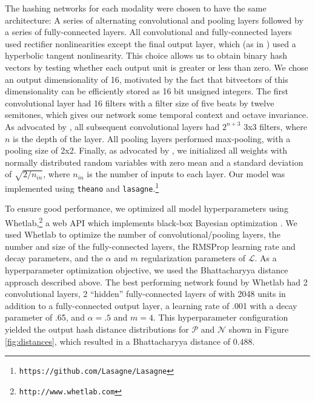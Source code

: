 \documentclass{article}
\begin{document}
The hashing networks for each modality were chosen to have the same architecture: A series of alternating convolutional and pooling layers followed by a series of fully-connected layers.
All convolutional and fully-connected layers used rectifier nonlinearities except the final output layer, which (as in \cite{masci2014multimodal}) used a hyperbolic tangent nonlinearity.
This choice allows us to obtain binary hash vectors by testing whether each output unit is greater or less than zero.
We chose an output dimensionality of 16, motivated by the fact that bitvectors of this dimensionality can be efficiently stored as 16 bit unsigned integers.
The first convolutional layer had 16 filters with a filter size of five beats by twelve semitones, which gives our network some temporal context and octave invariance.
As advocated by \cite{simonyan2014very}, all subsequent convolutional layers had $2^{n + 3}$ 3x3 filters, where $n$ is the depth of the layer.
All pooling layers performed max-pooling, with a pooling size of 2x2.
Finally, as advocated by \cite{he2015delving}, we initialized all weights with normally distributed random variables with zero mean and a standard deviation of $\sqrt{2/n_{in}}$, where $n_{in}$ is the number of inputs to each layer.
Our model was implemented using \texttt{theano} \cite{bastien2012theano} and \texttt{lasagne}.\footnote{\texttt{https://github.com/Lasagne/Lasagne}}

To ensure good performance, we optimized all model hyperparameters using Whetlab,\footnote{\texttt{http://www.whetlab.com}} a web API which implements black-box Bayesian optimization \cite{snoek2012practical}.
We used Whetlab to optimize the number of convolutional/pooling layers, the number and size of the fully-connected layers, the RMSProp learning rate and decay parameters, and the $\alpha$ and $m$ regularization parameters of $\mathcal{L}$.
As a hyperparameter optimization objective, we used the Bhattacharyya distance approach described above.
The best performing network found by Whetlab had 2 convolutional layers, 2 ``hidden'' fully-connected layers of with 2048 units in addition to a fully-connected output layer, a learning rate of .001 with a decay parameter of .65, and $\alpha = .5$ and $m = 4$.
This hyperparameter configuration yielded the output hash distance distributions for $\mathcal{P}$ and $\mathcal{N}$ shown in Figure \ref{fig:distances}, which resulted in a Bhattacharyya distance of $0.488$.
\end{document}
